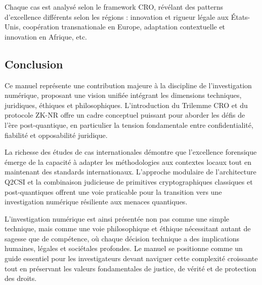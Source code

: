 \documentclass[12pt, a4paper]{article}
\begin{document}
Chaque cas est analysé selon le framework CRO, révélant des patterns d'excellence différents selon les régions : innovation et rigueur légale aux États-Unis, coopération transnationale en Europe, adaptation contextuelle et innovation en Afrique, etc.

\subsection*{Conclusion}
Ce manuel représente une contribution majeure à la discipline de l'investigation numérique, proposant une vision unifiée intégrant les dimensions techniques, juridiques, éthiques et philosophiques. L'introduction du Trilemme CRO et du protocole ZK-NR offre un cadre conceptuel puissant pour aborder les défis de l'ère post-quantique, en particulier la tension fondamentale entre confidentialité, fiabilité et opposabilité juridique.

La richesse des études de cas internationales démontre que l'excellence forensique émerge de la capacité à adapter les méthodologies aux contextes locaux tout en maintenant des standards internationaux. L'approche modulaire de l'architecture Q2CSI et la combinaison judicieuse de primitives cryptographiques classiques et post-quantiques offrent une voie praticable pour la transition vers une investigation numérique résiliente aux menaces quantiques.

L'investigation numérique est ainsi présentée non pas comme une simple technique, mais comme une voie philosophique et éthique nécessitant autant de sagesse que de compétence, où chaque décision technique a des implications humaines, légales et sociétales profondes. Le manuel se positionne comme un guide essentiel pour les investigateurs devant naviguer cette complexité croissante tout en préservant les valeurs fondamentales de justice, de vérité et de protection des droits.
\end{document}
